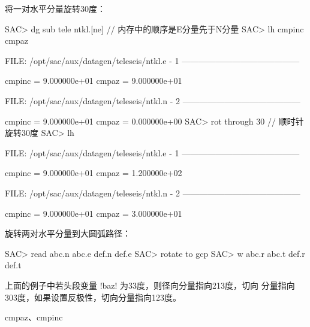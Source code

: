 将一对水平分量旋转30度：
\begin{SACCode}
SAC> dg sub tele ntkl.[ne]          // 内存中的顺序是E分量先于N分量
SAC> lh cmpinc cmpaz

  FILE: /opt/sac/aux/datagen/teleseis/ntkl.e - 1
 ------------------------------------------

     cmpinc = 9.000000e+01
      cmpaz = 9.000000e+01

  FILE: /opt/sac/aux/datagen/teleseis/ntkl.n - 2
 ------------------------------------------

     cmpinc = 9.000000e+01
      cmpaz = 0.000000e+00
SAC> rot through 30                 // 顺时针旋转30度
SAC> lh

  FILE: /opt/sac/aux/datagen/teleseis/ntkl.e - 1
 ------------------------------------------

     cmpinc = 9.000000e+01
      cmpaz = 1.200000e+02

  FILE: /opt/sac/aux/datagen/teleseis/ntkl.n - 2
 ------------------------------------------

     cmpinc = 9.000000e+01
      cmpaz = 3.000000e+01
\end{SACCode}

旋转两对水平分量到大圆弧路径：
\begin{SACCode}
SAC> read abc.n abc.e def.n def.e
SAC> rotate to gcp
SAC> w abc.r abc.t def.r def.t
\end{SACCode}
上面的例子中若头段变量 !baz! 为33度，则径向分量指向213度，切向
分量指向303度，如果设置反极性，切向分量指向123度。

cmpaz、cmpinc
